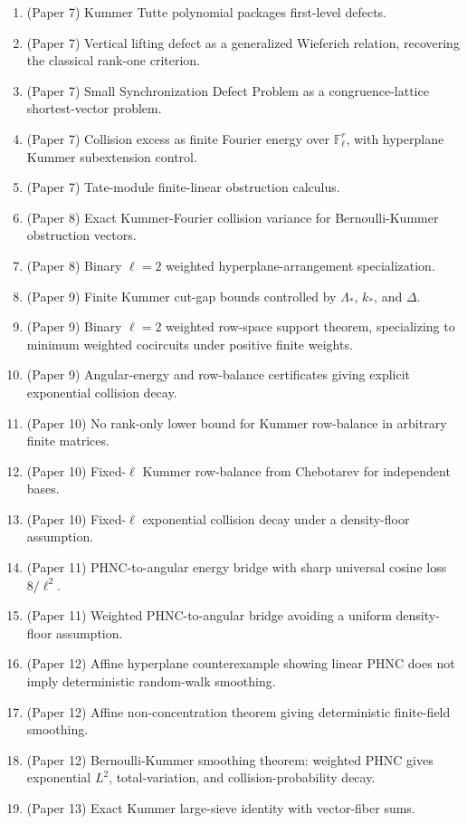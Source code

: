 \documentclass[11pt]{article}
\newcommand{\F}{\mathbb F}
\newcommand{\1}{\mathbf 1}
\begin{document}
\begin{enumerate}[leftmargin=2em]
\item (Paper 7) Kummer Tutte polynomial packages first-level defects.
\item (Paper 7) Vertical lifting defect as a generalized Wieferich relation, recovering the classical rank-one criterion.
\item (Paper 7) Small Synchronization Defect Problem as a congruence-lattice shortest-vector problem.
\item (Paper 7) Collision excess as finite Fourier energy over \(\F_\ell^r\), with hyperplane Kummer subextension control.
\item (Paper 7) Tate-module finite-linear obstruction calculus.
\item (Paper 8) Exact Kummer-Fourier collision variance for Bernoulli-Kummer obstruction vectors.
\item (Paper 8) Binary \(\ell=2\) weighted hyperplane-arrangement specialization.
\item (Paper 9) Finite Kummer cut-gap bounds controlled by \(\Lambda_*\), \(k_*\), and \(\Delta\).
\item (Paper 9) Binary \(\ell=2\) weighted row-space support theorem, specializing to minimum weighted cocircuits under positive finite weights.
\item (Paper 9) Angular-energy and row-balance certificates giving explicit exponential collision decay.
\item (Paper 10) No rank-only lower bound for Kummer row-balance in arbitrary finite matrices.
\item (Paper 10) Fixed-\(\ell\) Kummer row-balance from Chebotarev for independent bases.
\item (Paper 10) Fixed-\(\ell\) exponential collision decay under a density-floor assumption.
\item (Paper 11) PHNC-to-angular energy bridge with sharp universal cosine loss \(8/\ell^2\).
\item (Paper 11) Weighted PHNC-to-angular bridge avoiding a uniform density-floor assumption.
\item (Paper 12) Affine hyperplane counterexample showing linear PHNC does not imply deterministic random-walk smoothing.
\item (Paper 12) Affine non-concentration theorem giving deterministic finite-field smoothing.
\item (Paper 12) Bernoulli-Kummer smoothing theorem: weighted PHNC gives exponential \(L^2\), total-variation, and collision-probability decay.
\item (Paper 13) Exact Kummer large-sieve identity with vector-fiber sums.

\end{enumerate}
\end{document}

